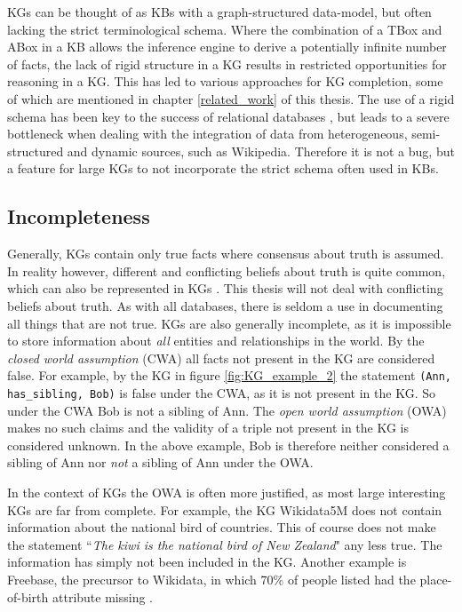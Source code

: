 KGs can be thought of as KBs with a graph-structured data-model, but often lacking the strict terminological schema. Where the combination of a TBox and ABox in a KB allows the inference engine to derive a potentially infinite number of facts, the lack of rigid structure in a KG results in restricted opportunities for reasoning in a KG. This has led to various approaches for KG completion, some of which are mentioned in chapter \ref{related_work} of this thesis. The use of a rigid schema has been key to the success of relational databases \cite{codd2002relational}, but leads to a severe bottleneck when dealing with the integration of data from heterogeneous, semi-structured and dynamic sources, such as Wikipedia. Therefore it is not a bug, but a feature for large KGs to not incorporate the strict schema often used in KBs.

\subsection{Incompleteness}
\label{Integrity_of_KGs}
Generally, KGs contain only true facts where consensus about truth is assumed. In reality however, different and conflicting beliefs about truth is quite common, which can also be represented in KGs \cite{subjective_kgs}. This thesis will not deal with conflicting beliefs about truth. As with all databases, there is seldom a use in documenting all things that are not true. KGs are also generally incomplete, as it is impossible to store information about \textit{all} entities and relationships in the world. By the \textit{closed world assumption} (CWA) all facts not present in the KG are considered false. For example, by the KG in figure \ref{fig:KG_example_2} the statement \texttt{(Ann, has\_sibling, Bob)} is false under the CWA, as it is not present in the KG. So under the CWA Bob is not a sibling of Ann. The \textit{open world assumption} (OWA) makes no such claims and  the validity of a triple not present in the KG is considered unknown. In the above example, Bob is therefore neither considered a sibling of Ann nor \textit{not} a sibling of Ann under the OWA.

In the context of KGs the OWA is often more justified, as most large interesting KGs are far from complete. For example, the KG Wikidata5M does not contain information about the national bird of countries. This of course does not make the statement ``\textit{The kiwi is the national bird of New Zealand}" any less true. The information has simply not been included in the KG. Another example is Freebase, the precursor to Wikidata, in which 70\% of people listed had the place-of-birth attribute missing \cite{west2014knowledge}.

